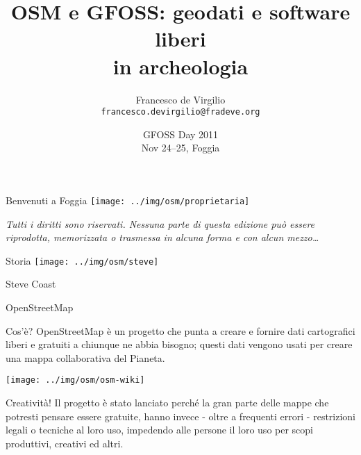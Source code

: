 \documentclass[xcolor=svgnames]{beamer}
\title[Geodati e software liberi in archeologia]{OSM e GFOSS: geodati e software liberi\\in archeologia}
\author[Francesco \mbox{de Virgilio}]{Francesco de Virgilio \\ \texttt{\tiny francesco.devirgilio@fradeve.org}}
\date[GFOSSDay 2011]{GFOSS Day 2011\\\footnotesize{Nov 24--25, Foggia}}
\begin{document}

	{
	\begin{frame}
		\titlepage
	\end{frame}
	}


	\begin{frame}{Benvenuti a Foggia}
		\centering\texttt{[image: ../img/osm/proprietaria]}
		\vfill
		\begin{center}
			\textit{Tutti i diritti sono riservati. Nessuna parte di questa edizione può essere riprodotta, memorizzata o trasmessa in alcuna forma e con alcun mezzo\ldots}
		\end{center}
	\end{frame}


	\begin{frame}{Storia}
		\centering\texttt{[image: ../img/osm/steve]}
		\begin{center}
			Steve Coast
		\end{center}
	\end{frame}


	\begin{frame}{OpenStreetMap}
		\begin{block}{Cos'è?}
			OpenStreetMap è un progetto che punta a creare e fornire dati cartografici liberi e gratuiti a chiunque ne abbia bisogno; questi dati vengono usati per creare una mappa collaborativa del Pianeta.
		\end{block}
		\vfill
		\centering\texttt{[image: ../img/osm/osm-wiki]}
	\end{frame}


	\begin{frame}{Creatività!}
		Il progetto è stato lanciato perché la gran parte delle mappe che potresti pensare essere gratuite, hanno invece - oltre a frequenti errori - restrizioni legali o tecniche al loro uso, impedendo alle persone il loro uso per scopi produttivi, creativi ed altri.

		\begin{center}
			\fontsize{60}{70}\selectfont \ccShareAlike
		\end{center}
	\end{frame}
\end{document}
